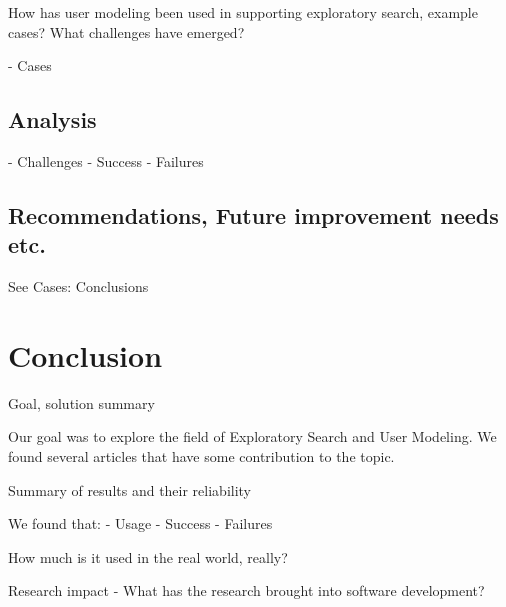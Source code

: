 \documentclass{sigchi}
\begin{document}
How has user modeling been used in supporting exploratory search, example cases? What challenges have emerged? 

- Cases

\subsection{Analysis}

- Challenges
- Success
- Failures

\subsection{Recommendations, Future improvement needs etc.}

See Cases: Conclusions

\section{Conclusion}
Goal, solution summary

Our goal was to explore the field of Exploratory Search and User Modeling. We found several articles that have some contribution to the topic.

Summary of results and their reliability 

We found that:
- Usage
- Success
- Failures

How much is it used in the real world, really?

Research impact
- What has the research brought into software development?

\nocite{*} %

%
%
%
%
%
\balance



\end{document}
